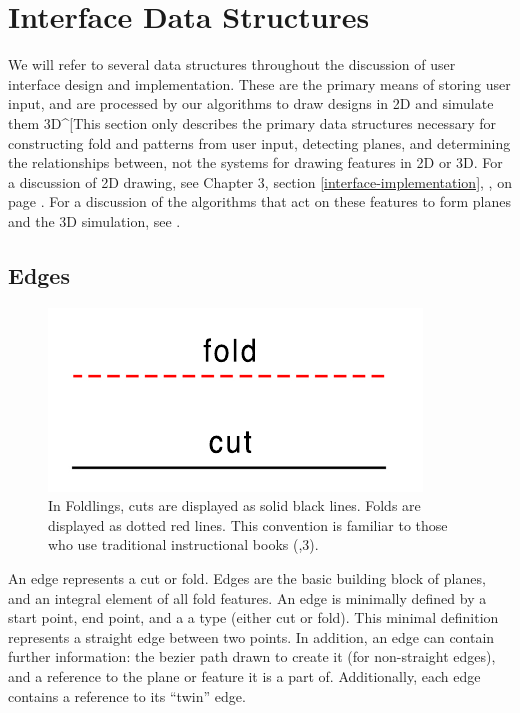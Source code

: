 \section{Interface Data Structures}\label{interface-data-structures}

We will refer to several data structures throughout the discussion of
user interface design and implementation. These are the primary means of
storing user input, and are processed by our algorithms to draw designs
in 2D and simulate them 3D\^{}{[}This section only describes the primary
data structures necessary for constructing fold and patterns from user
input, detecting planes, and determining the relationships between, not
the systems for drawing features in 2D or 3D. For a discussion of 2D
drawing, see Chapter 3, section \ref{interface-implementation},
, on page
\pageref{interface-implementation}. For a discussion of the algorithms
that act on these features to form planes and the 3D simulation, see
\citet{mallen}.

\subsection{Edges}\label{edges}

\begin{figure}[htbp]
\centering
\includegraphics{figures/33_UI_Interface_Data_Structures/foldvsedge.pdf}
\caption{In Foldlings, cuts are displayed as solid black lines. Folds
are displayed as dotted red lines. This convention is familiar to those
who use traditional instructional books
(\citet{berenson1972kirigami},3).}
\end{figure}

An edge represents a cut or fold. Edges are the basic building block of
planes, and an integral element of all fold features. An edge is
minimally defined by a start point, end point, and a a type (either cut
or fold). This minimal definition represents a straight edge between two
points. In addition, an edge can contain further information: the bezier
path drawn to create it (for non-straight edges), and a reference to the
plane or feature it is a part of. Additionally, each edge contains a
reference to its ``twin'' edge.


